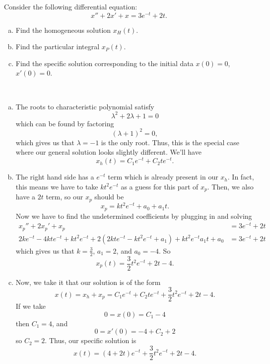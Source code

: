 \documentclass[12pt]{article} %
\begin{document}
\newpage
\begin{problem}
Consider the following differential equation:
\[
x''+2x'+x=3e^{-t}+2t.
\]
\begin{enumerate}[(a)]
    \item Find the homogeneous solution $x_H(t)$.
    \item Find the particular integral $x_P(t)$.
    \item Find the specific solution corresponding to the initial data $x(0)=0$, $x'(0)=0$.
\end{enumerate}
\end{problem}
\begin{solution}~
\begin{enumerate}[(a)]
    \item The roots to characteristic polynomial satisfy
    \[
    \lambda^2 + 2\lambda + 1 = 0
    \]
    which can be found by factoring
    \[
    (\lambda+1)^2=0,
    \]
    which gives us that $\lambda=-1$ is the only root.  Thus, this is the special case where our general solution looks slightly different.  We'll have
    \[
    x_h(t)=C_1e^{-t}+C_2te^{-t}.
    \]
    \item The right hand side has a $e^{-t}$ term which is already present in our $x_h$. In fact, this means we have to take $kt^2e^{-t}$ as a guess for this part of $x_p$. Then, we also have a $2t$ term, so our $x_p$ should be
    \[
    x_p =kt^2e^{-t}+ a_0 + a_1 t.
    \]
    Now we have to find the undetermined coefficients by plugging in and solving
    \begin{align*}
        x_p''+2x_p'+x_p&=3e^{-t}+2t\\
    2ke^{-t}-4kte^{-t}+kt^2e^{-t}+2(2kte^{-t}-kt^2e^{-t}+a_1)+kt^2e^{-t}a_1t+a_0&=3e^{-t}+2t
    \end{align*}
    which gives us that $k=\frac{3}{2}$, $a_1=2$, and $a_0=-4$. So 
    \[
    x_p(t)=\frac{3}{2}t^2e^{-t}+2t-4.
    \]
    \item Now, we take it that our solution is of the form
    \[
    x(t)=x_h+x_p= C_1e^{-t}+C_2te^{-t}+\frac{3}{2}t^2e^{-t}+2t-4.
    \]
    If we take
    \[
    0=x(0)=C_1-4
    \]
    then $C_1=4$, and
    \[
    0=x'(0)=-4+C_2+2
    \]
    so $C_2=2$. Thus, our specific solution is
    \[
    x(t)=(4+2t)e^{-t}+\frac{3}{2}t^2e^{-t}+2t-4.
    \]
    
\end{enumerate}
\end{solution}
\end{document}
